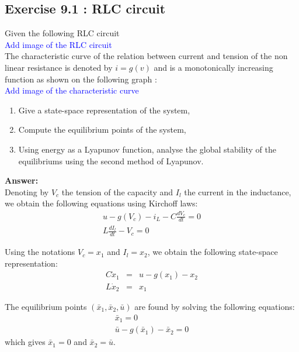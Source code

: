 \subsection*{Exercise 9.1 : RLC circuit}
Given the following RLC circuit\\ 

\textcolor{blue}{Add image of the RLC circuit}~\\

The characteristic curve of the relation between current and tension of the non linear resistance is denoted by $i=g(v)$ and is a monotonically increasing function as shown on the following graph :\\

\textcolor{blue}{Add image of the characteristic curve}~\\

\begin{enumerate}
\item Give a state-space representation of the system,
\item Compute the equilibrium points of the system,
\item Using energy as a Lyapunov function, analyse the global stability of the equilibriums using the second method of Lyapunov.
\end{enumerate}

\textbf{Answer: }~\\

Denoting by $V_c$ the tension of the capacity and $I_l$ the current in the inductance, we obtain the following equations using Kirchoff laws:
$$
\begin{array}{l}
u-g(V_c)-i_L-C\frac{dV_c}{dt}=0\\
L\frac{dI_l}{dt}-V_c=0
\end{array}
$$

Using the notations $V_c=x_1$ and $I_l=x_2$, we obtain the following state-space representation:
$$
\begin{array}{rcl}
C\dot{x}_1&=&u-g(x_1)-x_2\\
L\dot{x}_2&=&x_1
\end{array}
$$

The equilibrium points $(\bar{x}_1,\bar{x}_2,\bar{u})$ are found by solving the following equations:
$$
\begin{array}{l}
\bar{x}_1=0\\
\bar{u}-g(\bar{x}_1)-\bar{x}_2=0
\end{array}
$$
which gives $\bar{x}_1=0$ and $\bar{x}_2=\bar{u}$.\\

